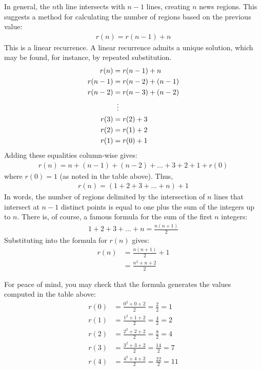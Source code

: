 \documentclass[12pt]{article}
\begin{document}
In general, the $n$th line intersects with $n-1$ lines, creating $n$ news regions. This suggests a method for calculating the number of regions based on the previous value:
\begin{align*}
r(n) = r(n-1) + n
\end{align*}
This is a linear recurrence. A linear recurrence admits a unique solution, which may be found, for instance, by repeated substitution. 
\begin{align*}
  r(n) & = r(n-1) + n \\
r(n-1) & = r(n-2) + (n-1) \\
r(n-2) & = r(n-3) + (n-2) \\
       & \vdotswithin{=} \\
  r(3) & = r(2) + 3 \\
  r(2) & = r(1) + 2 \\
  r(1) & = r(0) + 1 
\end{align*}
Adding these equalities column-wise gives:
\begin{align*}
r(n) = n + (n-1) + (n-2) + \ldots + 3 + 2 + 1 + r(0)
\end{align*}
where $r(0)=1$ (as noted in the table above). Thus,
\begin{align*}
r(n) = (1 + 2 + 3 + \ldots + n) + 1 
\end{align*}
In words, the number of regions delimited by the intersection of $n$ lines that intersect at $n-1$ distinct points is equal to one plus the sum of the integers up to $n$. There is, of course, a famous formula for the sum of the first $n$ integers: 
\begin{align*}
1 + 2 + 3 + \ldots + n = \frac{n(n+1)}{2}
\end{align*}
Substituting into the formula for $r(n)$ gives:
\begin{align*}
r(n) 
 & = \frac{n(n+1)}{2} + 1 \\
 & = \frac{n^2 + n + 2}{2}
\end{align*}

For peace of mind, you may check that the formula generates the values computed in the table above:
\begin{align*}
r(0) & = \frac{0^2 + 0 + 2}{2} = \frac{2}{2} = 1 \\
r(1) & = \frac{1^2 + 1 + 2}{2} = \frac{4}{2} = 2 \\
r(2) & = \frac{2^2 + 2 + 2}{2} = \frac{8}{2} = 4 \\
r(3) & = \frac{3^2 + 3 + 2}{2} = \frac{14}{2} = 7 \\
r(4) & = \frac{4^2 + 4 + 2}{2} = \frac{22}{2} = 11
\end{align*}
\end{document}
